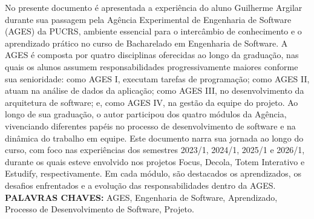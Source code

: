 \begin{resumo}
  No presente documento é apresentada a experiência do aluno Guilherme Argilar durante sua passagem pela Agência Experimental de Engenharia de Software (AGES) da PUCRS, ambiente essencial para o intercâmbio de conhecimento e o aprendizado prático no curso de Bacharelado em Engenharia de Software. A AGES é composta por quatro disciplinas oferecidas ao longo da graduação, nas quais os alunos assumem responsabilidades progressivamente maiores conforme sua senioridade: como AGES I, executam tarefas de programação; como AGES II, atuam na análise de dados da aplicação; como AGES III, no desenvolvimento da arquitetura de software; e, como AGES IV, na gestão da equipe do projeto. Ao longo de sua graduação, o autor participou dos quatro módulos da Agência, vivenciando diferentes papéis no processo de desenvolvimento de software e na dinâmica do trabalho em equipe. Este documento narra sua jornada ao longo do curso, com foco nas experiências dos semestres 2023/1, 2024/1, 2025/1 e 2026/1, durante os quais esteve envolvido nos projetos Focus, Decola, Totem Interativo e Estudify, respectivamente. Em cada módulo, são destacados os aprendizados, os desafios enfrentados e a evolução das responsabilidades dentro da AGES.
  \bigbreak\
  \\\textbf{PALAVRAS CHAVES:}
  AGES, Engenharia de Software, Aprendizado, Processo de Desenvolvimento de Software, Projeto.
\end{resumo}